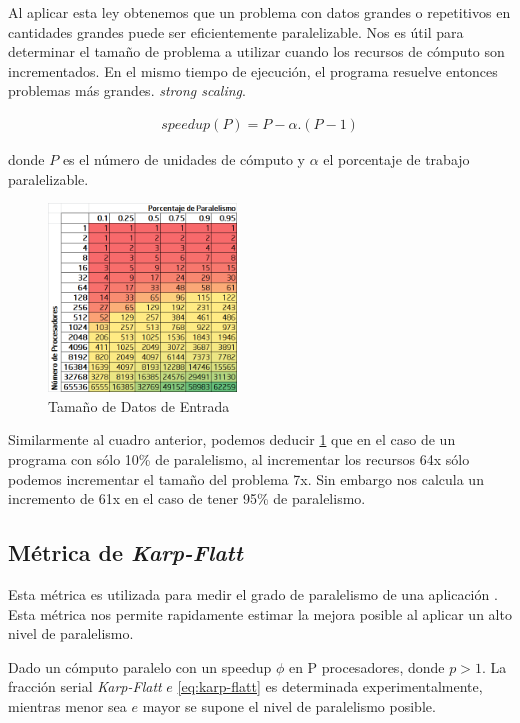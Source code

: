 \documentclass[a4paper]{report}
\begin{document}
\bigskip

Al aplicar esta ley obtenemos que un problema con datos grandes o repetitivos en cantidades grandes puede ser
eficientemente paralelizable. Nos es \'util para determinar el tama\~no de problema a utilizar cuando los recursos de c\'omputo son incrementados.
En el mismo tiempo de ejecuci\'on, el programa resuelve entonces problemas m\'as grandes.
{\it strong scaling}.

\begin{eqnarray}
\label{eq:gustafson}
speedup(P) = P - \alpha . ( P - 1)
\end{eqnarray}

donde $ P $ es el n\'umero de unidades de c\'omputo y $ \alpha $ el porcentaje de trabajo paralelizable.

\begin{figure}[H]
\label{fig:gustafson}
\begin{center}
\includegraphics[width=5cm]{gustafson.png}
\caption{Tama\~no de Datos de Entrada}
\end{center}
\end{figure}

Similarmente al cuadro anterior, podemos deducir \ref{fig:gustafson} que en el caso de un programa con s\'olo 10\% de paralelismo,
al incrementar los recursos 64x s\'olo podemos incrementar el tama\~no del problema 7x. Sin embargo nos calcula
un incremento de 61x en el caso de tener 95\% de paralelismo.

\subsection{M\'etrica de {\it Karp-Flatt}}

Esta m\'etrica es utilizada para medir el grado de paralelismo de una aplicaci\'on \cite{karp-flatt}.
Esta m\'etrica nos permite rapidamente estimar la mejora posible al aplicar un alto nivel de paralelismo.

\bigskip

Dado un c\'omputo paralelo con un speedup $ \phi $ en P procesadores, donde $ p > 1 $.
La fracci\'on serial {\it Karp-Flatt} $ e $ \ref{eq:karp-flatt} es determinada experimentalmente, mientras menor sea $ e $
mayor se supone el nivel de paralelismo posible.
\end{document}
